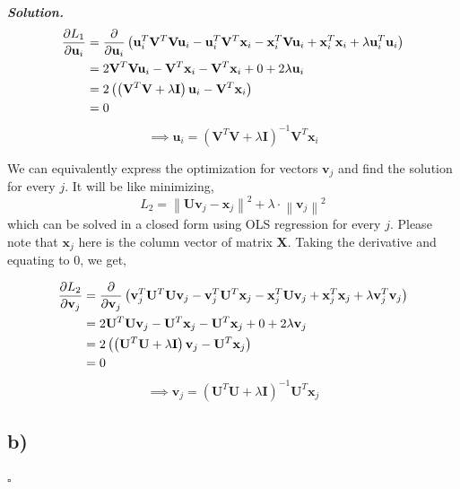 \documentclass[10pt]{article}
\newenvironment{solution}[1][\it{Solution}]{\textbf{#1. } }{$\square$}
\begin{document}
\begin{solution}
\begin{align*}
	\pdv{L_1}{\mathbf{u}_i} &= \pdv{}{\mathbf{u}_i}\left(\mathbf{u}_i^{T}\mathbf{V}^{T}\mathbf{V}\mathbf{u}_i - \mathbf{u}_i^{T}\mathbf{V}^{T}\mathbf{x}_{i} - \mathbf{x}_{i}^{T}\mathbf{V}\mathbf{u}_i + \mathbf{x}_{i}^{T}\mathbf{x}_{i} + \lambda\mathbf{u}_i^{T}\mathbf{u}_i\right)\\
	&= 2\mathbf{V}^{T}\mathbf{V}\mathbf{u}_i - \mathbf{V}^{T}\mathbf{x}_i - \mathbf{V}^{T}\mathbf{x}_i + 0 + 2\lambda\mathbf{u}_i\\
	&= 2\left(\left(\mathbf{V}^{T}\mathbf{V}+\lambda\mathbf{I}\right)\mathbf{u}_i - \mathbf{V}^{T}\mathbf{x}_i\right)\\
	&= 0\\
\end{align*}
$$
	\implies \boxed{\mathbf{u}_i = \left(\mathbf{V}^{T}\mathbf{V}+\lambda\mathbf{I}\right)^{-1}\mathbf{V}^{T}\mathbf{x}_i}
$$

We can equivalently express the optimization for vectors $\mathbf{v}_{j}$ and find the solution for every $j$. It will be like minimizing,
$$
L_{2} = \left\|\mathbf{U} \mathbf{v}_{j}-\mathbf{x}_{j}\right\|^{2}+\lambda \cdot\left\|\mathbf{v}_{j}\right\|^{2}
$$
which can be solved in a closed form using OLS regression for every $j$. Please note that $\mathbf{x}_j$ here is the column vector of matrix $\mathbf{X}$. Taking the derivative and equating to $0$, we get,

\begin{align*}
	\pdv{L_2}{\mathbf{v}_j} &= \pdv{}{\mathbf{v}_j}\left(\mathbf{v}_j^{T}\mathbf{U}^{T}\mathbf{U}\mathbf{v}_j - \mathbf{v}_j^{T}\mathbf{U}^{T}\mathbf{x}_{j} - \mathbf{x}_{j}^{T}\mathbf{U}\mathbf{v}_j + \mathbf{x}_{j}^{T}\mathbf{x}_{j} + \lambda\mathbf{v}_j^{T}\mathbf{v}_j\right)\\
	&= 2\mathbf{U}^{T}\mathbf{U}\mathbf{v}_j - \mathbf{U}^{T}\mathbf{x}_j - \mathbf{U}^{T}\mathbf{x}_j + 0 + 2\lambda\mathbf{v}_j\\
	&= 2\left(\left(\mathbf{U}^{T}\mathbf{U}+\lambda\mathbf{I}\right)\mathbf{v}_j - \mathbf{U}^{T}\mathbf{x}_j\right)\\
	&= 0\\
\end{align*}
$$
	\implies \boxed{\mathbf{v}_j = \left(\mathbf{U}^{T}\mathbf{U}+\lambda\mathbf{I}\right)^{-1}\mathbf{U}^{T}\mathbf{x}_j}
$$

\subsection*{b)}


\end{solution}
\end{document}
